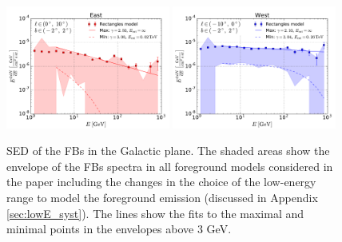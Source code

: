 
\begin{figure}[h]
\centering
 \includegraphics[width=0.48\textwidth]{plots/Summary_SED_b=0_l=5.pdf}
  \includegraphics[width=0.48\textwidth]{plots/Summary_SED_b=0_l=-5.pdf}
 \caption{SED of the FBs in the Galactic plane. 
 The shaded areas show the envelope of the FBs spectra in all foreground models considered in the paper
including the changes in the choice of the low-energy range to model the foreground emission
(discussed in Appendix \ref{sec:lowE_syst}).
The lines show the fits to the maximal and minimal points in the envelopes above 3 GeV.
}
 \label{fig:spec_summary}
\end{figure}


